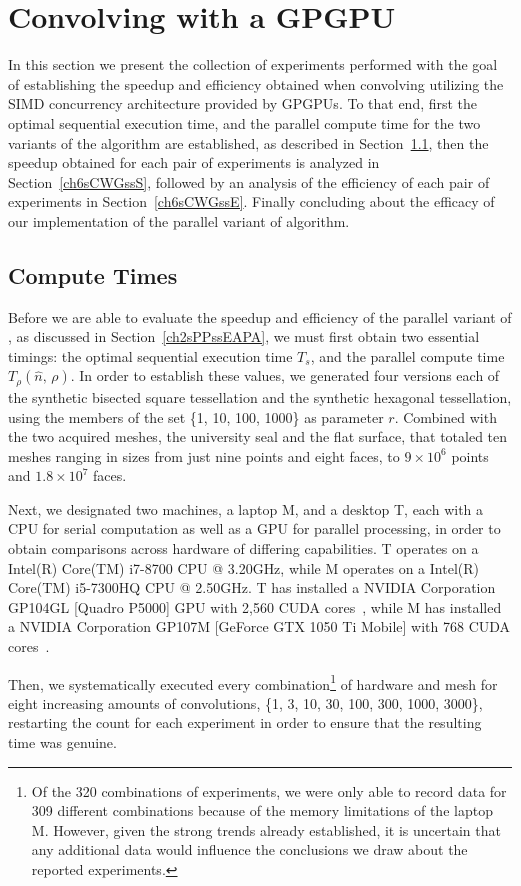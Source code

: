 \section{Convolving with a GPGPU}
\label{ch6sCWG}
In this section we present the collection of experiments performed with the goal of establishing the speedup and efficiency obtained when convolving  utilizing the \gls{SIMD} concurrency architecture provided by \glspl{GPGPU}. To that end, first the optimal sequential execution time, and the parallel compute time for the two variants of the  algorithm are established, as described in Section~\ref{ch6sCWGssCT}, then the speedup obtained for each pair of experiments is analyzed in Section~\ref{ch6sCWGssS}, followed by an analysis of the efficiency of each pair of experiments in Section~\ref{ch6sCWGssE}. Finally concluding about the efficacy of our implementation of the parallel variant of  algorithm.

%
%
%
%
\subsection{Compute Times}
\label{ch6sCWGssCT}
Before we are able to evaluate the \gls{speedup} and \gls{efficiency} of the parallel variant of , as discussed in Section~\ref{ch2sPPssEAPA}, we must first obtain two essential timings: the optimal sequential execution time $\mathit{T_s}$, and the parallel compute time $\mathit{T_{\rho}}(\hat{n},\,\rho)$. In order to establish these values, we generated four versions each of the synthetic bisected square tessellation and the synthetic hexagonal tessellation, using the members of the set \{1, 10, 100, 1000\} as parameter $r$. Combined with the two acquired meshes, the university seal and the flat surface, that totaled ten meshes ranging in sizes from just nine points and eight faces, to $9\times 10^6$ points and $1.8\times 10^7$ faces.

Next, we designated two machines, a laptop M, and a desktop T, each with a CPU for serial computation as well as a GPU for parallel processing, in order to obtain comparisons across hardware of differing capabilities. T operates on a Intel(R) Core(TM) i7-8700 CPU @ 3.20GHz, while M operates on a Intel(R) Core(TM) i5-7300HQ CPU @ 2.50GHz. T has installed a NVIDIA Corporation GP104GL [Quadro P5000] GPU with 2,560 CUDA cores~\cite{quadro5k}, while M has installed a NVIDIA Corporation GP107M [GeForce GTX 1050 Ti Mobile] with 768 CUDA cores~\cite{geforce1050}.

Then, we systematically executed every combination\footnote{Of the 320  combinations of experiments, we were only able to record data for 309 different combinations because of the memory limitations of the laptop M. However, given the strong trends already established, it is uncertain that any additional data would influence the conclusions we draw about the reported experiments.} of hardware and mesh for eight increasing amounts of convolutions, \{1, 3, 10, 30, 100, 300, 1000, 3000\}, restarting the count for each experiment in order to ensure that the resulting time was genuine.

